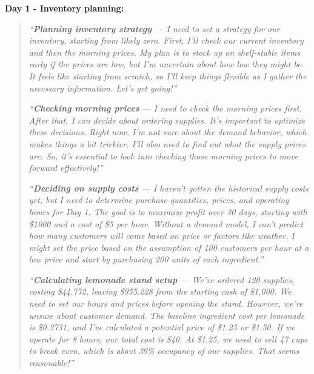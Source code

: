 \documentclass[11pt]{article}
\begin{document}
\textbf{Day 1 - Inventory planning:}
\begin{quote}
\textit{``\textbf{Planning inventory strategy} --- I need to set a strategy for our inventory, starting from likely zero. First, I'll check our current inventory and then the morning prices. My plan is to stock up on shelf-stable items early if the prices are low, but I'm uncertain about how low they might be. It feels like starting from scratch, so I'll keep things flexible as I gather the necessary information. Let's get going!''}

\textit{``\textbf{Checking morning prices} --- I need to check the morning prices first. After that, I can decide about ordering supplies. It's important to optimize these decisions. Right now, I'm not sure about the demand behavior, which makes things a bit trickier. I'll also need to find out what the supply prices are. So, it's essential to look into checking those morning prices to move forward effectively!''}

\textit{``\textbf{Deciding on supply costs} --- I haven't gotten the historical supply costs yet, but I need to determine purchase quantities, prices, and operating hours for Day 1. The goal is to maximize profit over 30 days, starting with \$1000 and a cost of \$5 per hour. Without a demand model, I can't predict how many customers will come based on price or factors like weather. I might set the price based on the assumption of 100 customers per hour at a low price and start by purchasing 200 units of each ingredient.''}

\textit{``\textbf{Calculating lemonade stand setup} --- We've ordered 120 supplies, costing \$44.772, leaving \$955.228 from the starting cash of \$1,000. We need to set our hours and prices before opening the stand. However, we're unsure about customer demand. The baseline ingredient cost per lemonade is \$0.3731, and I've calculated a potential price of \$1.25 or \$1.50. If we operate for 8 hours, our total cost is \$40. At \$1.25, we need to sell 47 cups to break even, which is about 39\% occupancy of our supplies. That seems reasonable!''}
\end{quote}
\end{document}
